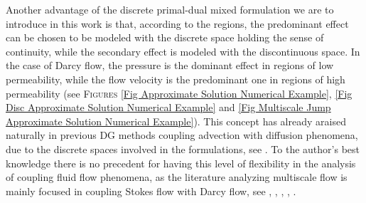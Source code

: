 \documentclass[3p]{elsarticle}
\begin{document}
Another advantage of the discrete primal-dual mixed formulation we are to introduce in this work is that, according to the regions, the predominant effect can be chosen to be modeled with the discrete space holding the sense of continuity, while the secondary effect is modeled with the discontinuous space. In the case of Darcy flow, the pressure is the dominant effect in regions of low permeability, while the flow velocity is the predominant one in regions of high permeability (see \textsc{Figures}  \ref{Fig Approximate Solution Numerical Example}, \ref{Fig Disc Approximate Solution Numerical Example} and  \ref{Fig Multiscale Jump Approximate Solution Numerical Example}).  This concept has already araised naturally in previous DG methods coupling advection with diffusion phenomena, due to the discrete spaces involved in the formulations, see \cite{Dawson}. To the author's best knowledge there is no precedent for having this level of flexibility in the analysis of coupling fluid flow phenomena, as the literature analyzing multiscale flow is mainly focused in coupling Stokes flow with Darcy flow, see \cite{ArbBrunson2007}, \cite{ArbLehr2006}, \cite{Gatica3}, \cite{Layton}, \cite{MoralesShow3}.
\end{document}
